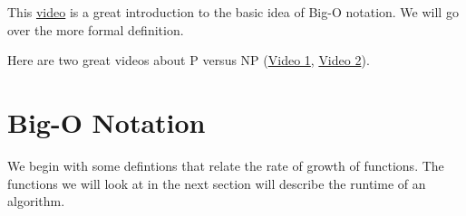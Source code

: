            

This \href{https://youtu.be/__vX2sjlpXU}{video} is a great introduction to the basic idea of Big-O notation.  We will go over the more formal definition.

    

Here are two great videos about P versus NP (\href{https://youtu.be/EHp4FPyajKQ}{Video 1}, \href{https://youtu.be/YX40hbAHx3s}{Video 2}).  
%

         


%
%

\section{Big-O Notation}
We begin with some defintions that relate the rate of growth of functions.   The functions we will look at in the next section will describe the runtime of an algorithm.  



